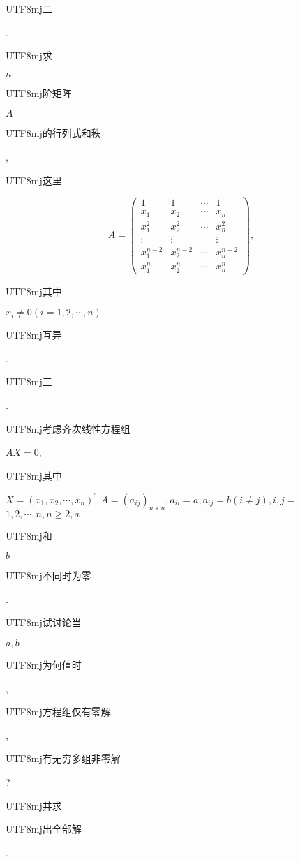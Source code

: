 \documentclass[10pt]{article}
\begin{document}
\begin{CJK}{UTF8}{mj}二\end{CJK}. \begin{CJK}{UTF8}{mj}求\end{CJK} $n$ \begin{CJK}{UTF8}{mj}阶矩阵\end{CJK} $A$ \begin{CJK}{UTF8}{mj}的行列式和秩\end{CJK}, \begin{CJK}{UTF8}{mj}这里\end{CJK}
$$
A=\left(\begin{array}{cccc}
1 & 1 & \cdots & 1 \\
x_{1} & x_{2} & \cdots & x_{n} \\
x_{1}^{2} & x_{2}^{2} & \cdots & x_{n}^{2} \\
\vdots & \vdots & & \vdots \\
x_{1}^{n-2} & x_{2}^{n-2} & \cdots & x_{n}^{n-2} \\
x_{1}^{n} & x_{2}^{n} & \cdots & x_{n}^{n}
\end{array}\right),
$$
\begin{CJK}{UTF8}{mj}其中\end{CJK} $x_{i} \neq 0(i=1,2, \cdots, n)$ \begin{CJK}{UTF8}{mj}互异\end{CJK}.

\begin{CJK}{UTF8}{mj}三\end{CJK}. \begin{CJK}{UTF8}{mj}考虑齐次线性方程组\end{CJK} $A X=0$, \begin{CJK}{UTF8}{mj}其中\end{CJK} $X=\left(x_{1}, x_{2}, \cdots, x_{n}\right)^{\prime}, A=\left(a_{i j}\right)_{n \times n}, a_{i i}=a, a_{i j}=b(i \neq j), i, j=$ $1,2, \cdots, n, n \geqslant 2, a$ \begin{CJK}{UTF8}{mj}和\end{CJK} $b$ \begin{CJK}{UTF8}{mj}不同时为零\end{CJK}. \begin{CJK}{UTF8}{mj}试讨论当\end{CJK} $a, b$ \begin{CJK}{UTF8}{mj}为何值时\end{CJK}, \begin{CJK}{UTF8}{mj}方程组仅有零解\end{CJK}, \begin{CJK}{UTF8}{mj}有无穷多组非零解\end{CJK}? \begin{CJK}{UTF8}{mj}并求\end{CJK} \begin{CJK}{UTF8}{mj}出全部解\end{CJK}.
\end{document}
